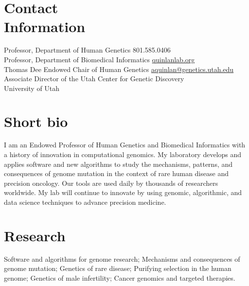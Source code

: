 \documentclass[margin,line]{cv}
\begin{document}
\begin{resume}
    \section{\mysidestyle Contact\\Information}
    Professor, Department of Human Genetics                           \hfill 801.585.0406\\%
    Professor, Department of Biomedical Informatics                   \hfill \url{quinlanlab.org}\\%
    Thomas Dee Endowed Chair of Human Genetics                        \hfill \url{aquinlan@genetics.utah.edu} \\%
    Associate Director of the Utah Center for Genetic Discovery       \\%
    University of Utah                                                 \\%

    \section{\mysidestyle Short bio} I am an Endowed Professor of Human Genetics and Biomedical Informatics with a history of innovation in
    computational genomics. My laboratory develops and applies software and new algorithms to study the 
    mechanisms, patterns, and consequences of genome mutation in the context of rare human disease and precision oncology. Our tools
    are used daily by thousands of researchers worldwide. My lab will continue to innovate by using genomic,
    algorithmic, and data science techniques to advance precision medicine.
    

    \section{\mysidestyle Research} Software and algorithms for genome research; 
    Mechanisms and consequences of genome mutation;  Genetics of rare disease; 
    Purifying selection in the human genome; Genetics of male infertility; 
    Cancer genomics and targeted therapies.
    

\end{resume}
\end{document}
